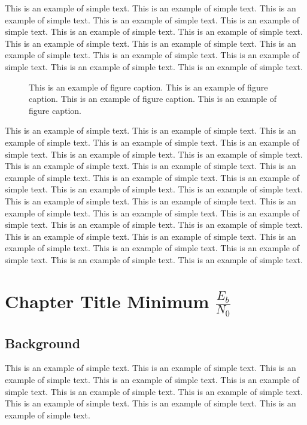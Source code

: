 \documentclass[11pt]{now}
\begin{document}
                   This is an example of simple text. This is an
example of simple text.  This is an example of simple text. This is
an example of simple text.  This is an example of simple text. This
is an example of simple text.  This is an example of simple text.
This is an example of simple text.  This is an example of simple
text. This is an example of simple text.  This is an example of
simple text. This is an example of simple text.  This is an example
of simple text. This is an example of simple text.
\begin{figure}
\centerline{}
\caption{This is an
example of figure caption. This is an example of figure caption. This
is an example of figure caption. This is an example of figure
caption.}
\end{figure}

                   This is an example of simple text. This is an
example of simple text.  This is an example of simple text. This is
an example of simple text.  This is an example of simple text. This
is an example of simple text.  This is an example of simple text.
This is an example of simple text.  This is an example of simple
text. This is an example of simple text.  This is an example of
simple text. This is an example of simple text.  This is an example
of simple text. This is an example of simple text.  This is an
example of simple text. This is an example of simple text.  This is
an example of simple text. This is an example of simple text.  This
is an example of simple text. This is an example of simple text.
This is an example of simple text. This is an example of simple text.
This is an example of simple text. This is an example of simple text.
This is an example of simple text. This is an example of simple text.
This is an example of simple text. This is an example of simple text.

\chapter{Chapter Title Minimum $\frac{E_b}{N_0}$}

\section{Background} This is an example of simple text. This is an
example of simple text.  This is an example of simple text. This is
an example of simple text.  This is an example of simple text. This
is an example of simple text.  This is an example of simple text.
This is an example of simple text.  This is an example of simple
text. This is an example of simple text.
\end{document}

